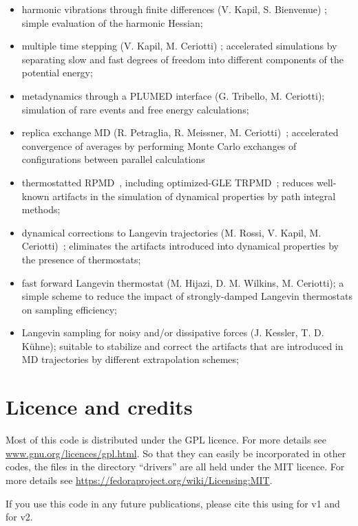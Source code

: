 \documentclass[11pt,english,fleqn]{report}
\begin{document}
\begin{itemize}
\item harmonic vibrations through finite differences (V. Kapil, S. Bienvenue)  \cite{ross+16prl}; {simple evaluation of the harmonic Hessian;}
\item multiple time stepping (V. Kapil, M. Ceriotti) \cite{kapi+16jcp}; {accelerated simulations by separating slow and fast degrees of freedom into different components of the potential energy;}
\item metadynamics through a PLUMED interface (G. Tribello, M. Ceriotti); {simulation of rare events and free energy calculations;}
\item replica exchange MD (R. Petraglia, R. Meissner, M. Ceriotti)~\cite{petr+15jcc}; {accelerated convergence of averages by performing Monte Carlo exchanges of configurations between parallel calculations}
\item thermostatted RPMD~\cite{ross+14jcp}, including optimized-GLE TRPMD~\cite{ross+18jcp}; {reduces well-known artifacts in the simulation of dynamical properties by path integral methods;}
\item dynamical corrections to Langevin trajectories (M. Rossi, V. Kapil, M. Ceriotti)~\cite{ross+18jcp}; {eliminates the artifacts introduced into dynamical properties by the presence of thermostats;}
\item fast forward Langevin thermostat (M. Hijazi, D. M. Wilkins, M. Ceriotti); {a simple scheme to reduce the impact of strongly-damped Langevin thermostats on sampling efficiency;} \cite{hija+18jcp}
\item Langevin sampling for noisy and/or dissipative forces (J. Kessler, T. D. K\"uhne); {suitable to stabilize and correct the artifacts that are introduced in MD trajectories by different extrapolation schemes;}
\end{itemize}


\section{Licence and credits}

Most of this code is distributed under the GPL licence. For more details see
\url{www.gnu.org/licences/gpl.html}.
So that they can easily be incorporated in other codes, the files
in the directory {}``drivers'' are all held under the MIT licence.
For more details see \url{https://fedoraproject.org/wiki/Licensing:MIT}.

If you use this code in any
future publications, please cite this using \cite{ceri+14cpc} for v1 and \cite{Kapil:2019ju} for v2.
\end{document}
